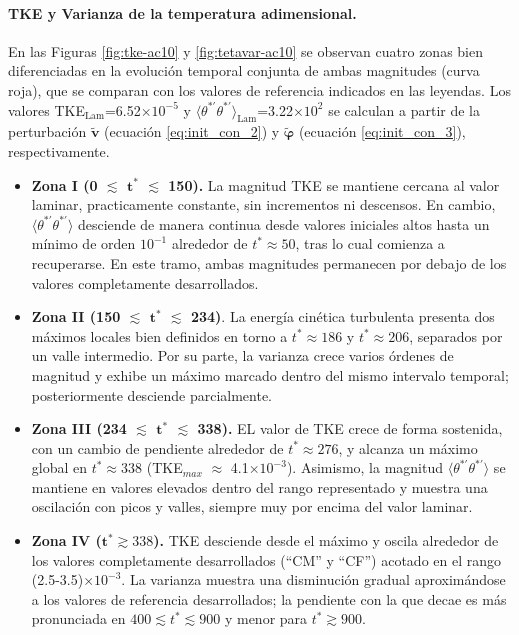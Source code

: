\paragraph{TKE y Varianza de la temperatura adimensional.}
En las Figuras \ref{fig:tke-ac10} y \ref{fig:tetavar-ac10} se observan cuatro zonas bien diferenciadas en la evolución temporal conjunta de ambas magnitudes (curva roja), que se comparan con los valores de referencia indicados en las leyendas. Los valores TKE$_{\text{Lam}}$=6.52$\times10^{-5}$ y $\langle \theta^{* \prime} \theta^{* \prime} \rangle_{\text{Lam}}$=3.22$\times10^{2}$ se calculan a partir de la perturbación $\widetilde{\mathbf{v}}$ (ecuación \ref{eq:init_con_2}) y $\widetilde{\boldsymbol{\varphi}}$ (ecuación \ref{eq:init_con_3}), respectivamente.

\begin{itemize}
\item \textbf{Zona I (0 $\lesssim$ $\mathbf{t^*}$ $\lesssim$ 150).} La magnitud TKE se mantiene cercana al valor laminar, practicamente constante, sin incrementos ni descensos. En cambio, $\langle \theta^{* \prime} \theta^{* \prime} \rangle$ desciende de manera continua desde valores iniciales altos hasta un mínimo de orden $10^{-1}$ alrededor de $t^*\approx50$, tras lo cual comienza a recuperarse. En este tramo, ambas magnitudes permanecen por debajo de los valores completamente desarrollados.

\item \textbf{Zona II (150 $\lesssim$ $\mathbf{t^*}$ $\lesssim$ 234)}. La energía cinética turbulenta presenta dos máximos locales bien definidos en torno a $t^*\approx186$ y $t^*\approx206$, separados por un valle intermedio. Por su parte, la varianza crece varios órdenes de magnitud y exhibe un máximo marcado dentro del mismo intervalo temporal; posteriormente desciende parcialmente.

\item \textbf{Zona III (234 $\lesssim$ $\mathbf{t^*}$ $\lesssim$ 338).} EL valor de TKE crece de forma sostenida, con un cambio de pendiente alrededor de $t^*\approx276$, y alcanza un máximo global en $t^*\approx338$ (TKE$_{max}$ $\approx$ 4.1$\times 10^{-3}$). Asimismo, la magnitud $\langle \theta^{* \prime} \theta^{* \prime} \rangle$ se mantiene en valores elevados dentro del rango representado y muestra una oscilación con picos y valles, siempre muy por encima del valor laminar.

\item \textbf{Zona IV ($\mathbf{t^*} \gtrsim 338$).} TKE desciende desde el máximo y oscila alrededor de los valores completamente desarrollados (``CM'' y ``CF'') acotado en el rango (2.5-3.5)$\times 10^{-3}$. La varianza muestra una disminución gradual aproximándose a los valores de referencia desarrollados; la pendiente con la que decae es más pronunciada en $400\lesssim t^*\lesssim900$ y menor para $t^*\gtrsim900$.
\end{itemize}


